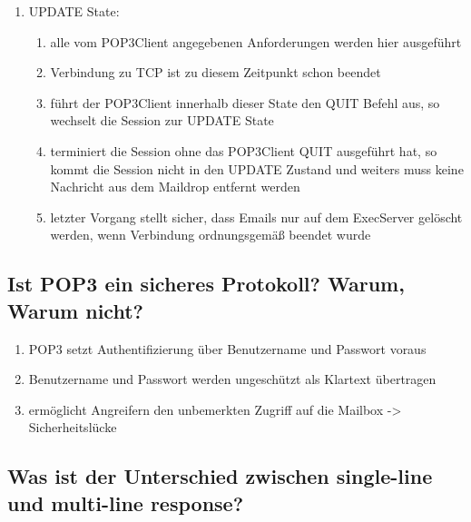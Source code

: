 \documentclass[11pt]{article}
\begin{document}
\begin{enumerate}
        \item UPDATE State:
        \begin{enumerate}
            \item alle vom POP3Client angegebenen Anforderungen werden hier ausgeführt
            \item Verbindung zu TCP ist zu diesem Zeitpunkt schon beendet
            \item führt der POP3Client innerhalb dieser State den QUIT Befehl aus, so
            wechselt die Session zur UPDATE State
            \item terminiert die Session ohne das POP3Client QUIT ausgeführt hat, so kommt
            die Session nicht in den UPDATE Zustand und weiters muss keine Nachricht
            aus dem Maildrop entfernt werden
            \item letzter Vorgang stellt sicher, dass Emails nur auf dem ExecServer gelöscht werden,
            wenn Verbindung ordnungsgemäß beendet wurde
        \end{enumerate}
    \end{enumerate}
    \subsection{Ist POP3 ein sicheres Protokoll? Warum, Warum nicht?}

    \begin{enumerate}
        \item POP3 setzt Authentifizierung über Benutzername und Passwort voraus
        \item Benutzername und Passwort werden ungeschützt als Klartext übertragen
        \item ermöglicht Angreifern den unbemerkten Zugriff auf die Mailbox -> Sicherheitslücke
    \end{enumerate}
    \subsection{Was ist der Unterschied zwischen single-line und multi-line response?}
\end{document}

